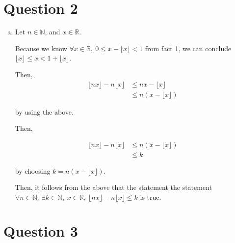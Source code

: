 \documentclass[12pt]{article}
\begin{document}
\section*{Question 2}

\begin{enumerate}[a.]
    \item

    Let $n \in \mathbb{N}$, and $x \in \mathbb{R}$.

    \bigskip

    Because we know $\forall x \in \mathbb{R},\: 0 \leq x - \lfloor x \rfloor < 1$ from
    fact 1, we can conclude $\lfloor x \rfloor \leq x < 1 + \lfloor x \rfloor$.

    \bigskip

    Then,
    \setcounter{equation}{0}
    \begin{align}
        \lfloor nx \rfloor - n \lfloor x \rfloor &\leq nx - \lfloor x \rfloor\\
        &\leq n(x - \lfloor x \rfloor)
    \end{align}

    by using the above.

    \bigskip

    Then,

    \begin{align}
        \lfloor nx \rfloor - n \lfloor x \rfloor &\leq n(x - \lfloor x \rfloor)\\
        &\leq k
    \end{align}

    by choosing $k = n(x - \lfloor x \rfloor)$.

    \bigskip

    Then, it follows from the above that the statement the statement
    $\forall n \in \mathbb{N},\:\exists k \in \mathbb{N},\:x \in \mathbb{R},\:\lfloor
    nx \rfloor - n \lfloor x \rfloor \leq k$ is true.



\end{enumerate}

\section*{Question 3}
\end{document}
